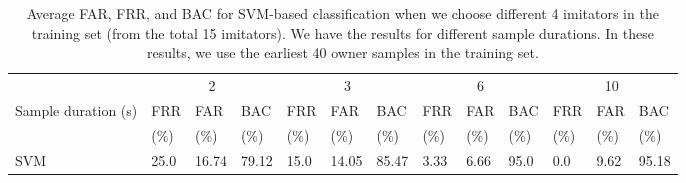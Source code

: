 \begin{table}[b]
\small
\begin{tabular}{|l||l|l|l||l|l|l||l|l|l||l|l|l|}\hline
& \multicolumn{3}{|c||}{2}& \multicolumn{3}{|c||}{3}& \multicolumn{3}{|c||}{6}& \multicolumn{3}{|c|}{10}\\\cline{2-13}
Sample duration (s)& FRR & FAR & BAC & FRR & FAR & BAC & FRR & FAR & BAC & FRR & FAR & BAC\\
&(\%) &(\%) &(\%) &(\%) &(\%) &(\%) &(\%) &(\%) &(\%) &(\%) &(\%) &(\%)\\\hline

SVM          & 25.0 & 16.74 &79.12 & 15.0 & 14.05 & 85.47 & 3.33& 6.66& 95.0  & 0.0& 9.62& 95.18\\\hline

\end{tabular}
\caption{Average FAR, FRR, and BAC for SVM-based classification when we choose different 4 imitators in the training set (from the total 15 imitators). We have the results for different sample durations. In these results, we use the earliest 40 owner samples in the training set.\label{tab:kfoldfalse-svm}}
\end{table}


